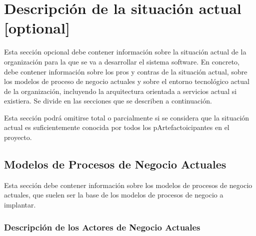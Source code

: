 \section{Descripción de la situación actual [optional]} 

\begin{textoazul}
  Esta sección opcional debe contener información sobre la situación actual de la organización para la que se va a desarrollar el sistema software. En concreto, debe contener información sobre los pros y contras de la situación actual, sobre los modelos de proceso de negocio actuales y sobre el entorno tecnológico actual de la organización, incluyendo la arquitectura orientada a servicios actual si existiera. Se divide en las secciones que se describen a continuación.

Esta sección podrá omitirse total o parcialmente si se considera que la situación actual es suficientemente conocida por todos los pArtefactoicipantes en el proyecto.


\end{textoazul}



\subsection{Modelos de Procesos de Negocio Actuales}

\begin{textoazul}
Esta sección debe contener información sobre los modelos de procesos de negocio actuales, que suelen ser la base de los modelos de procesos de negocio a implantar.


  \end{textoazul}
 

\subsubsection{Descripción de los Actores de Negocio Actuales}

